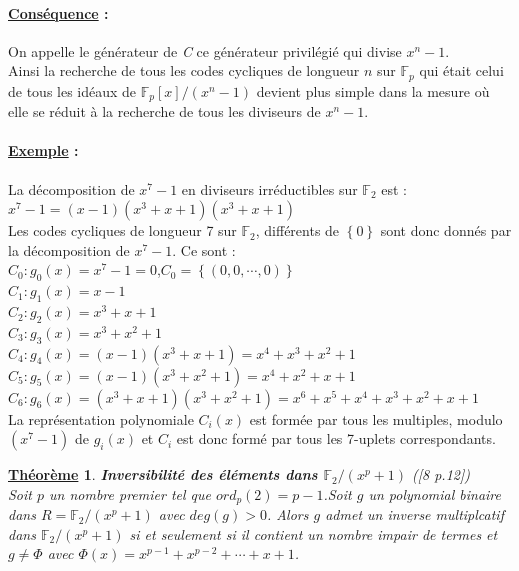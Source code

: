 \documentclass[12pt,openany]{report}
\newtheorem{theorem}{\underline{Théorème}}
\begin{document}
\paragraph{\underline{Conséquence} :\\}
On appelle le générateur de \textit{C} ce générateur privilégié qui divise $x^n-1$.\\
Ainsi la recherche de tous les codes cycliques de longueur $n$ sur $\mathbb{F}_p$ qui était celui de tous les idéaux de 
$\mathbb{F}_{p}[x]/(x^n-1)$ devient plus simple dans la mesure où elle se réduit à la recherche de tous les diviseurs de $x^n-1$.
\paragraph{\underline{Exemple} :\\}
La décomposition de $x^7-1$ en diviseurs irréductibles sur $\mathbb{F}_2$ est :\\
$x^7-1=(x-1)(x^3+x+1)(x^3+x+1)$\\
Les codes cycliques de longueur 7 sur $\mathbb{F}_2$, différents  de $\left\lbrace 0\right\rbrace  $ sont donc donnés par la décomposition de $x^7-1 $. Ce sont :\\


$\mathit{C}_{0}:g_{0}(x)=x^7-1=0$,$\mathit{C}_{0}=\left\lbrace \left( 0,0,\cdots,0 \right)  \right\rbrace $\\
$ \mathit{C}_{1}:g_{1}(x)=x-1$\\
$\mathit{C}_{2}:g_{2}(x)=x^3+x+1$\\
$\mathit{C}_{3}:g_{3}(x)=x^3+x^2+1$\\
$\mathit{C}_{4}:g_{4}(x)=(x-1)(x^3+x+1)=x^4+x^3+x^2+1$\\
$\mathit{C}_{5}:g_{5}(x)=(x-1)(x^3+x^2+1)=x^4+x^2+x+1$\\
$\mathit{C}_{6}:g_{6}(x)=(x^3+x+1)(x^3+x^2+1)=x^6+x^5+x^4+x^3+x^2+x+1$\\
La représentation polynomiale $\mathit{C}_{i}(x)$ est formée par tous les multiples, modulo $(x^7-1)$ de $g_{i}(x)$ et $  \mathit{C}_{i}$ est donc formé par tous les 7-uplets correspondants.\\



\begin{theorem}
\textbf{ Inversibilité des éléments dans $\mathbb{F}_2/(x^p+1)$}  ([8 p.12])\\
Soit $p$ un nombre premier tel que $ord_p(2)=p-1$.Soit $g$ un  polynomial binaire  dans $\mathit{R}=\mathbb{F}_2/(x^p+1) $ avec $deg(g)>0$. Alors $g$ admet un inverse multiplcatif dans $\mathbb{F}_2/(x^p+1)$ si et seulement si il contient un nombre impair de termes et $g\neq \Phi$
avec $\Phi(x)=x^{p-1}+x^{p-2}+\cdots+x+1$.\\

\end{theorem}
\end{document}

